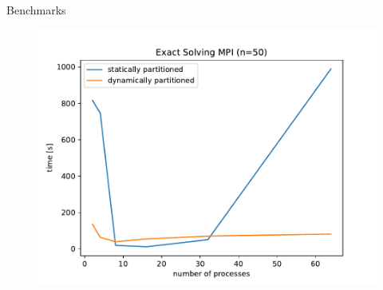 \begin{frame}{Benchmarks}
  \vspace{-0.25cm}
  \begin{figure}
    \includegraphics[width=\linewidth,height=.9\textheight,keepaspectratio]{./assets/exact-mpi.pdf}
  \end{figure}
\end{frame}
